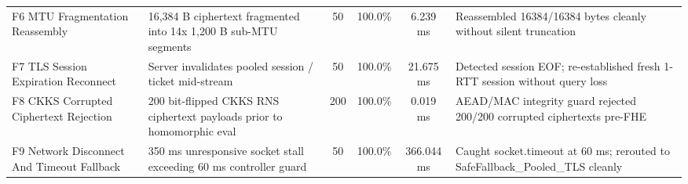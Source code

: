 \documentclass[10pt,journal,compsoc]{IEEEtran}
\begin{document}
\begin{table}[!htbp]
\begin{tabular}{@{}llcccl@{}}
F6 MTU Fragmentation Reassembly & 16,384 B ciphertext fragmented into 14x 1,200 B sub-MTU segments & 50 & 100.0\% & 6.239 ms & Reassembled 16384/16384 bytes cleanly without silent truncation \\
F7 TLS Session Expiration Reconnect & Server invalidates pooled session / ticket mid-stream & 50 & 100.0\% & 21.675 ms & Detected session EOF; re-established fresh 1-RTT session without query loss \\
F8 CKKS Corrupted Ciphertext Rejection & 200 bit-flipped CKKS RNS ciphertext payloads prior to homomorphic eval & 200 & 100.0\% & 0.019 ms & AEAD/MAC integrity guard rejected 200/200 corrupted ciphertexts pre-FHE \\
F9 Network Disconnect And Timeout Fallback & 350 ms unresponsive socket stall exceeding 60 ms controller guard & 50 & 100.0\% & 366.044 ms & Caught socket.timeout at 60 ms; rerouted to SafeFallback\_Pooled\_TLS cleanly \\
\bottomrule\end{tabular}\end{table}
\end{document}
